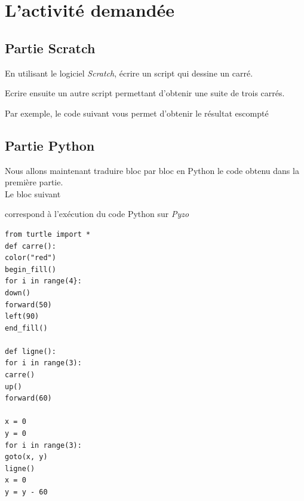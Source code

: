 \section{L'activité demandée}



\subsection{Partie Scratch}

En utilisant le logiciel \emph{Scratch}, écrire un script qui dessine un carré.


Ecrire ensuite un autre script permettant d'obtenir une suite de trois carrés. 


Par exemple, le code suivant vous permet d'obtenir le résultat escompté


\subsection{Partie Python}

Nous allons maintenant traduire bloc par bloc en Python le code obtenu dans la première partie.\\

Le bloc suivant


correspond à l'exécution du code Python sur \emph{Pyzo}


\begin{verbatim}
from turtle import *
def carre():
color("red")
begin_fill()
for i in range(4}:
down()
forward(50)
left(90)
end_fill()

def ligne():
for i in range(3):
carre()
up()
forward(60)

x = 0
y = 0
for i in range(3):
goto(x, y)
ligne()
x = 0
y = y - 60
\end{verbatim}